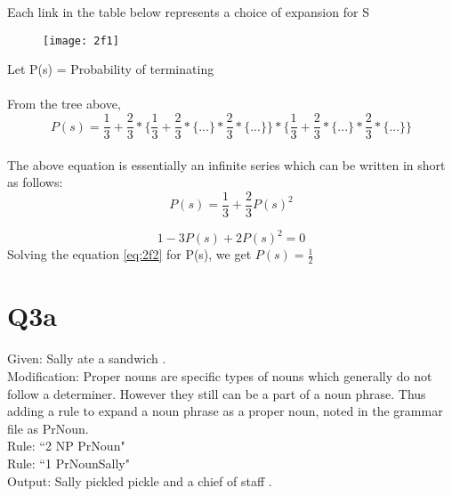 \documentclass[12pt]{article}
\begin{document}
Each link in the table below represents a choice of expansion for S\\
\begin{figure}[h]
	\texttt{[image: 2f1]}
	\centering
\end{figure}
Let P(s) = Probability of terminating\\
\\
From the tree above,\\ 
\begin{equation}
\label{eq:2f_e1}
		P(s) = \frac{1}{3} + \frac{2}{3}*\{\frac{1}{3} + \frac{2}{3}*\{...\}*\frac{2}{3}*\{...\}\}*\{\frac{1}{3} + \frac{2}{3}*\{...\}*\frac{2}{3}*\{...\}\}
\end{equation}
\\
The above equation is essentially an infinite series which can be written in short as follows:
\\
\begin{equation}
\label{eq:2f1}
P(s) = \frac{1}{3} + \frac{2}{3}P(s)^2
\end{equation}

\begin{equation}
\label{eq:2f2}
1 - 3P(s) + 2P(s)^2 = 0
\end{equation}
Solving the equation \ref{eq:2f2} for P(s), we get \(P(s) = \frac{1}{2}\)

\pagebreak
\section*{Q3a}
Given: Sally ate a sandwich .\\
Modification: Proper nouns are specific types of nouns which generally do not follow a determiner. However they still can be a part of a noun phrase. Thus adding a rule to expand a noun phrase as a proper noun, noted in the grammar file as PrNoun.\\
Rule: ``2\hspace{1cm}	NP\hspace{1cm} PrNoun"\\
Rule: ``1\hspace{1cm}	PrNoun\hspace{0.4cm}Sally"\\
Output: Sally pickled pickle and a chief of staff .\\
\pagebreak
\end{document}
